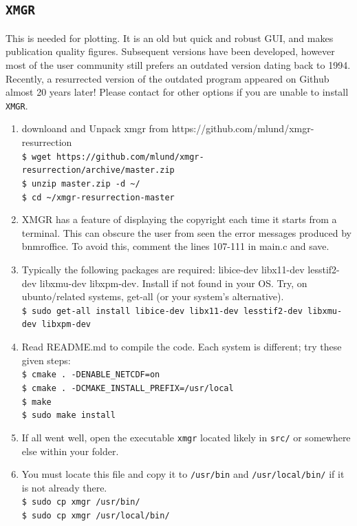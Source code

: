 \documentclass[10pt,letterpaper,oneside]{article}
\newcommand{\xmgr}{\texttt{XMGR}}
\begin{document}
\subsection{\xmgr}
This is needed for plotting. It is an old but quick and robust GUI, and makes publication quality figures. Subsequent versions have been developed, however most of the user community still prefers an outdated version dating back to 1994. Recently, a resurrected version of the outdated program appeared on Github almost 20 years later! Please contact  for other options if you are unable to install \xmgr.
\begin{enumerate}
 \item  downloand and Unpack  xmgr from https://github.com/mlund/xmgr-resurrection
 \\ \verb+$ wget https://github.com/mlund/xmgr-resurrection/archive/master.zip+
 \\ \verb+$ unzip master.zip -d ~/+
 \\ \verb+$ cd ~/xmgr-resurrection-master+

 \item  XMGR has a feature of displaying the copyright each time it starts from a terminal.
     This can obscure the user from seen the error messages produced by bnmroffice.
     To avoid this, comment the lines 107-111 in main.c and save.

 \item  Typically the following packages are required: libice-dev libx11-dev lesstif2-dev libxmu-dev libxpm-dev.
     Install if not found in your OS. Try, on ubunto/related systems, get-all (or your system's alternative).
 \\ \verb+$ sudo get-all install libice-dev libx11-dev lesstif2-dev libxmu-dev libxpm-dev+

 \item  Read README.md to compile the code. Each system is different; try these given steps:
 \\ \verb+$ cmake . -DENABLE_NETCDF=on+
 \\ \verb+$ cmake . -DCMAKE_INSTALL_PREFIX=/usr/local+
 \\ \verb+$ make+
 \\ \verb+$ sudo make install+

 \item  If all went well, open the executable \verb+xmgr+ located likely in \verb+src/+ or somewhere else within your folder.

 \item  You must locate this file and copy it to \verb+/usr/bin+ and \verb+/usr/local/bin/+ if it is not already there.
   \\  \verb+$ sudo cp xmgr /usr/bin/+
   \\  \verb+$ sudo cp xmgr /usr/local/bin/+
\end{enumerate}
\end{document}
